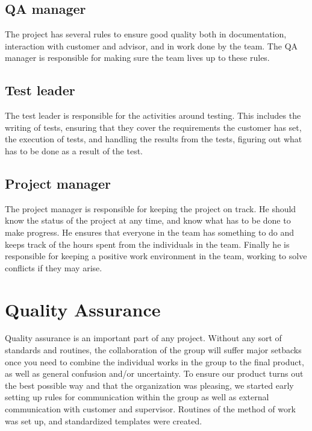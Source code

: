 \documentclass[11pt]{book}
\begin{document}
\subsection{QA manager}
The project has several rules to ensure good quality both in documentation, interaction with customer and advisor, and in work done by the team. The QA manager is responsible for making sure the team lives up to these rules.

\subsection{Test leader}
The test leader is responsible for the activities around testing. This includes the writing of tests, ensuring that they cover the requirements the customer has set, the execution of tests, and handling the results from the tests, figuring out what has to be done as a result of the test.

\subsection{Project manager}
The project manager is responsible for keeping the project on track. He should know the status of the project at any time, and know what has to be done to make progress. He ensures that everyone in the team has something to do and keeps track of the hours spent from the individuals in the team. Finally he is responsible for keeping a positive work environment in the team, working to solve conflicts if they may arise.

\section{Quality Assurance}
Quality assurance is an important part of any project. Without any sort of standards and routines, the collaboration of the group will suffer major setbacks once you need to combine the individual works in the group to the final product, as well as general confusion and/or uncertainty. To ensure our product turns out the best possible way and that the organization was pleasing, we started early setting up rules for communication within the group as well as external communication with customer and supervisor. Routines of the method of work was set up, and standardized templates were created.
\end{document}
